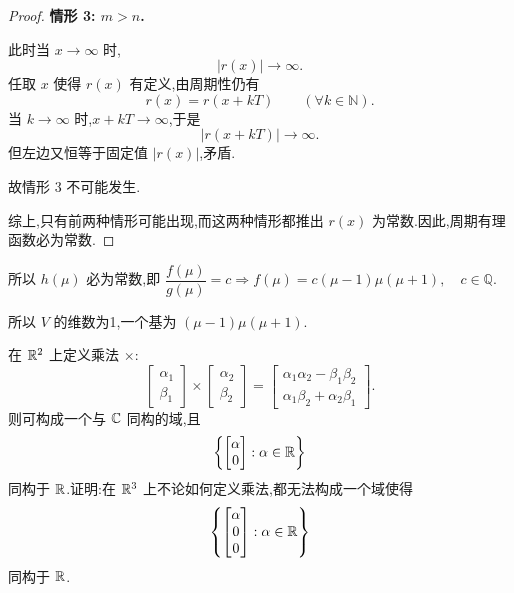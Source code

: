 \begin{problem}
\begin{solution}
\begin{proof}
            \medskip

            \noindent\textbf{情形 3: \(m>n\).}

            此时当 \(x\to\infty\) 时,
            \[
                |r(x)|\to\infty.
            \]
            任取 \(x\) 使得 \(r(x)\) 有定义,由周期性仍有
            \[
                r(x)=r(x+kT)\qquad (\forall k\in\mathbb{N}).
            \]
            当 \(k\to\infty\) 时,\(x+kT\to\infty\),于是
            \[
                |r(x+kT)|\to\infty.
            \]
            但左边又恒等于固定值 \(|r(x)|\),矛盾.

            故情形 3 不可能发生.

            \medskip

            综上,只有前两种情形可能出现,而这两种情形都推出 \(r(x)\) 为常数.因此,周期有理函数必为常数.
        \end{proof}

        所以 $h(\mu)$ 必为常数,即 $\dfrac{f(\mu)}{g(\mu)} = c \Rightarrow f(\mu) = c(\mu -1)\mu(\mu + 1), \quad c \in \mathbb{Q}$.
        
        所以 $V$ 的维数为1,一个基为 $(\mu -1)\mu(\mu + 1)$. 
    \end{solution}
\end{problem}

\begin{problem}[选做]
    在 $\mathbb{R}^2$ 上定义乘法 $\times$:
    \[
        \begin{bmatrix}
            \alpha_1\\
            \beta_1
        \end{bmatrix}
        \times
        \begin{bmatrix}
            \alpha_2\\
            \beta_2
        \end{bmatrix}
        =
        \begin{bmatrix}
            \alpha_1\alpha_2-\beta_1\beta_2\\
            \alpha_1\beta_2+\alpha_2\beta_1
        \end{bmatrix}.
    \]
    则可构成一个与 $\mathbb{C}$ 同构的域,且
    \[
        \left\{
        \begin{bmatrix}
            \alpha\\
            0
        \end{bmatrix}
        :\alpha\in\mathbb{R}
        \right\}
    \]
    同构于 $\mathbb{R}$.证明:在 $\mathbb{R}^3$ 上不论如何定义乘法,都无法构成一个域使得
    \[
        \left\{
        \begin{bmatrix}
            \alpha\\
            0\\
            0
        \end{bmatrix}
        :\alpha\in\mathbb{R}
        \right\}
    \]
    同构于 $\mathbb{R}$.
\end{problem}

